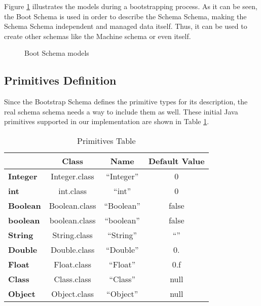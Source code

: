 Figure \ref{fig:schema_schema_models} illustrates the models during a bootstrapping process.
As it can be seen, the Boot Schema is used in order to describe the Schema Schema, making the Schema Schema independent and managed data itself.
Thus, it can be used to create other schemas like the Machine schema or even itself.

\begin{figure}[H]
	\centering
  	\caption{Boot Schema models}
  	\label{fig:schema_schema_models}
\end{figure}

\subsection{Primitives Definition}\label{Primitives Definition}
Since the Bootstrap Schema defines the primitive types for its description, the real schema schema needs a way to include them as well.
These initial Java primitives supported in our implementation are shown in Table \ref{tbl:primivites_table}.

\begin{table}[H]
	\centering
	\begin{tabular}{@{}lccc@{}}
	\toprule
	                 & \textbf{Class} & \textbf{Name} & \textbf{Default Value} \\ \midrule
	\textbf{Integer} & Integer.class  & ``Integer''   & 0                      \\
	\textbf{int}     & int.class      & ``int''       & 0                      \\
	\textbf{Boolean} & Boolean.class  & ``Boolean''   & false                  \\
	\textbf{boolean} & boolean.class  & ``boolean''   & false                  \\
	\textbf{String}  & String.class   & ``String''    & ``''                   \\
	\textbf{Double}  & Double.class   & ``Double''    & 0.                     \\
	\textbf{Float}   & Float.class    & ``Float''     & 0.f                    \\
	\textbf{Class}   & Class.class    & ``Class''     & null                   \\
	\textbf{Object}  & Object.class   & ``Object''    & null                   \\ \bottomrule
	\end{tabular}
	\caption{Primitives Table}
	\label{tbl:primivites_table}
\end{table}

